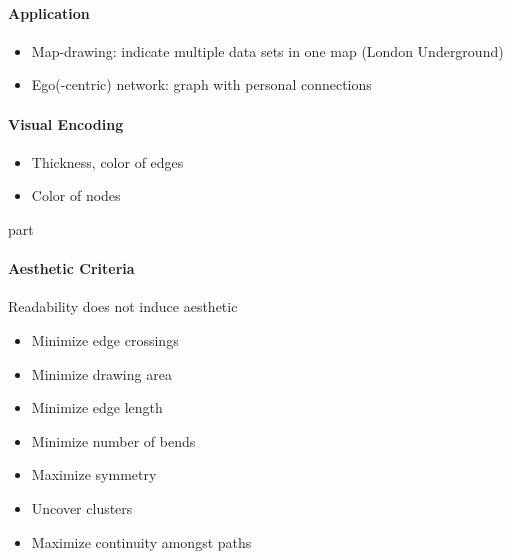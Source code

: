 \documentclass[10pt,a4paper]{article}
\begin{document}
	\paragraph{Application}
	\begin{itemize}
		\item Map-drawing: indicate multiple data sets in one map (London Underground)
		\item Ego(-centric) network: graph with personal connections 
	\end{itemize}
	
	\paragraph{Visual Encoding}
	\begin{itemize}
		\item Thickness, color of edges
		\item Color of nodes
	\end{itemize}
	part
	\paragraph{Aesthetic Criteria}
	Readability does not induce aesthetic
	\begin{itemize}
		\item Minimize edge crossings
		\item Minimize drawing area
		\item Minimize edge length
		\item Minimize number of bends
		\item Maximize symmetry
		\item Uncover clusters
		\item Maximize continuity amongst paths
	\end{itemize}
	
\end{document}
